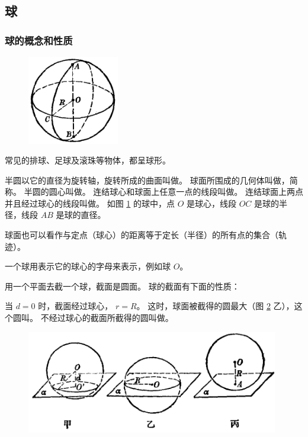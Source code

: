 \subsection{球}\label{subsec:2-5}

\subsubsection{球的概念和性质}

\begin{figure}
    \centering
    \includegraphics[width=4cm]{../pic/ltjh-ch2-42.png}
    \caption{}\label{fig:ltjh-2-42}
\end{figure}

常见的排球、足球及滚珠等物体，都呈球形。

半圆以它的直径为旋转轴，旋转所成的曲面叫做。
球面所围成的几何体叫做，简称。
半圆的圆心叫做。
连结球心和球面上任意一点的线段叫做。
连结球面上两点并且经过球心的线段叫做。
如图 \ref{fig:ltjh-2-42} 的球中，点 $O$ 是球心，线段 $OC$ 是球的半径，线段 $AB$ 是球的直径。

球面也可以看作与定点（球心）的距离等于定长（半径）的所有点的集合（轨迹）。

一个球用表示它的球心的字母来表示，例如球 $O$。

用一个平面去截一个球，截面是圆面。 球的截面有下面的性质：



当 $d = 0$ 时，截面经过球心， $r = R$。
这时，球面被截得的圆最大（图 \ref{fig:ltjh-2-43} 乙），这个圆叫。
不经过球心的截面所截得的圆叫做。

\begin{figure}[htbp]
    \centering
    \includegraphics[width=11cm]{../pic/ltjh-ch2-43.png}
    \caption{}\label{fig:ltjh-2-43}
\end{figure}

